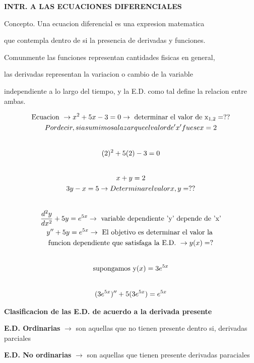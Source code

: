 \documentclass{article}
\begin{document}
\textbf{INTR. A LAS ECUACIONES DIFERENCIALES}

Concepto. Una ecuacion diferencial es una expresion matematica 

que contempla dentro de si la presencia de derivadas y funciones.

Comunmente las funciones representan cantidades fisicas en general,

las derivadas representan la variacion o cambio de la variable 

independiente a lo largo del tiempo, y la E.D. como tal  define la relacion entre ambas.




\begin{gather*}
\text{Ecuacion } \rightarrow   x^{2}+5x-3 = 0   \rightarrow \text{ determinar el valor de x}_{1,2} = ?? \\
Por decir, si asumimos al azar que el valor de 'x'  fuese x = 2 \\
\vspace{0.5em} \\
(2)^{2}+5(2)-3 = 0 \\
\vspace{0.5em} \\
x+y=2 \\
3y-x = 5    \rightarrow  Determinar el valor x,y = ?? \\
\vspace{0.5em} \\
\frac{d^{2}y}{dx^{2}}+ 5y =e^{5x}   \rightarrow \text{ variable dependiente 'y' depende de 'x'} \\
y'' + 5y = e^{5x}   \rightarrow \text{ El objetivo es determinar el valor la } \\
\text{funcion dependiente que satisfaga la E.D. } \rightarrow  y(x) = ? \\
\vspace{0.5em} \\
\text{supongamos y}(x) = 3e^{5x}   \\
\vspace{0.5em} \\
( 3e^{5x} )''+5( 3e^{5x} ) = e^{5x} 
\end{gather*}


\textbf{Clasificacion de las E.D. de acuerdo a la derivada presente}

\colorbox[RGB]{248,231,28}{\textbf{E.D. Ordinarias}} $\rightarrow$  son aquellas que no tienen presente dentro si, derivadas parciales

\textbf{E.D. No ordinarias} $\rightarrow$  son aquellas que tienen presente derivadas paraciales
\end{document}
